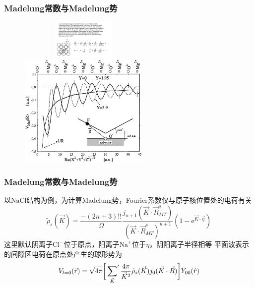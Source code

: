 {\frame
{
	\frametitle{\textrm{Madelung}常数与\textrm{Madelung}势}
\begin{figure}[h!]
\vspace*{-10pt}
\centering
\includegraphics[height=0.75in,width=2.50in,viewport=0 15 950 330,clip]{Figures/Madelung_Constant.jpg}\\
\includegraphics[height=2.15in,width=2.50in,viewport=0 0 850 750,clip]{Figures/Madelung-potential-V-Mad-for-different-impact-parameters-Y-along-a-grazing-trajectory.png}
\label{Madelung-Constant_Potential}
\end{figure}
}

\frame
{
	\frametitle{\textrm{Madelung}常数与\textrm{Madelung}势}
	以$\mathrm{NaCl}$结构为例，为计算\textrm{Madelung}势，\textrm{Fourier}系数仅与原子核位置处的电荷有关
\begin{displaymath}
	\tilde\rho_s(\vec K)=\dfrac{-(2n+3)!!}{\Omega}\dfrac{j_{n+1}(\vec K\cdot\vec R_{MT}^s)}{(\vec K\cdot\vec R_{MT}^s)^{n+1}}(1-\mathrm{e}^{\vec K\cdot\vec\eta})
\end{displaymath}
这里默认阴离子$\mathrm{Cl}^{-}$位于原点，阳离子$\mathrm{Na}^{+}$位于$\eta$，阴阳离子半径相等
\vskip 10pt
	平面波表示的间隙区电荷在原点处产生的球形势为
	\begin{displaymath}
		V_{l=0}(\vec r)=\sqrt{4\pi}\bigg[\sideset{}{^{\prime}}\sum_{\vec K}\dfrac{4\pi}{\vec K^2}\tilde\rho_s(\vec K)j_0(\vec K\cdot\vec R)\bigg]Y_{00}(\hat r)
	\end{displaymath}
}

}
